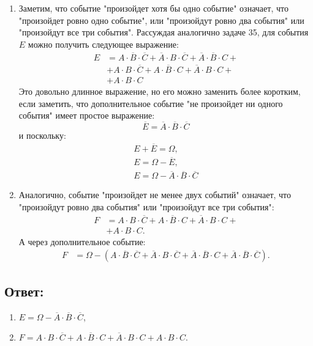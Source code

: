 \begin{enumerate}
    \item
    Заметим, что событие "произойдет хотя бы одно событие"{} означает, что "произойдет ровно одно событие"{}, или "произойдут ровно два события"{} или "произойдут все три события"{}.
    Рассуждая аналогично задаче 35, для события $E$ можно получить следующее выражение:
    \begin{align}
        E & = A \cdot \overline{B} \cdot \overline{C} + \overline{A} \cdot B \cdot \overline{C} + \overline{A} \cdot \overline{B} \cdot C + \\
        & + A \cdot B \cdot \overline{C} + A \cdot \overline{B} \cdot C + \overline{A} \cdot B \cdot C + \\
        & + A \cdot B \cdot C
    \end{align}
    Это довольно длинное выражение, но его можно заменить более коротким, если заметить, что дополнительное событие "не произойдет ни одного события"{} имеет простое выражение:
    \[
        \overline{E} = \overline{A} \cdot \overline{B} \cdot \overline{C}
    \]
    и поскольку:
    \begin{gather}
        E + \overline{E} = \Omega, \\
        E = \Omega - \overline{E}, \\
        E = \Omega - \overline{A} \cdot \overline{B} \cdot \overline{C}
    \end{gather}

    \item
    Аналогично, событие "произойдет не менее двух событий"{} означает, что "произойдут ровно два события"{} или "произойдут все три события"{}:
    \begin{align}
        F & = A \cdot B \cdot \overline{C} + A \cdot \overline{B} \cdot C + \overline{A} \cdot B \cdot C + \\
        & + A \cdot B \cdot C .
    \end{align}
    А через дополнительное событие:
    \begin{align}
        F & = \Omega - \left ( A \cdot \overline{B} \cdot \overline{C} + \overline{A} \cdot B \cdot \overline{C} + \overline{A} \cdot \overline{B} \cdot C + \overline{A} \cdot \overline{B} \cdot \overline{C} \right ) .
    \end{align}
\end{enumerate}

\subsection*{Ответ:}
\begin{enumerate}
    \item $E = \Omega - \overline{A} \cdot \overline{B} \cdot \overline{C}$,
    \item $F = A \cdot B \cdot \overline{C} + A \cdot \overline{B} \cdot C + \overline{A} \cdot B \cdot C + A \cdot B \cdot C .$
\end{enumerate}

